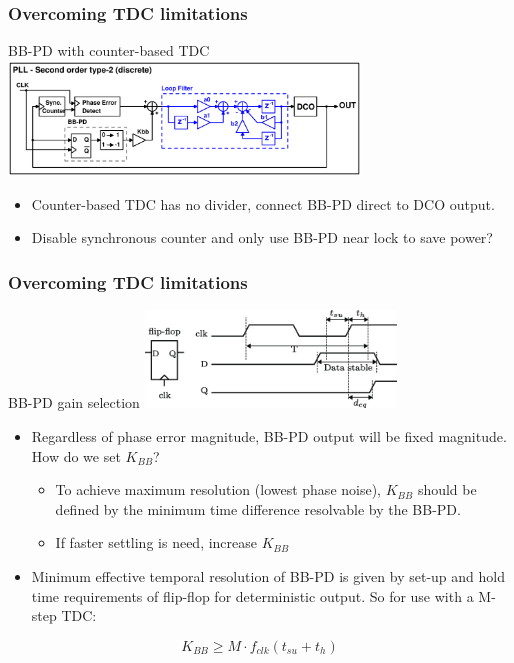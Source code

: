 \documentclass[t, screen, aspectratio=43]{beamer}
\begin{document}
\begin{frame}
	\frametitle{Overcoming TDC limitations}
	\begin{block}{BB-PD with counter-based TDC}
		\center\includegraphics[width=0.7\textwidth, angle=0]{pll_sec_order_bb_counter.pdf}
		\begin{itemize}
			\scriptsize
			\item Counter-based TDC has no divider, connect BB-PD direct to DCO output.
			\item Disable synchronous counter and only use BB-PD near lock to save power?
		\end{itemize}	
	\end{block}
\end{frame}

\begin{frame}
	\frametitle{Overcoming TDC limitations}
	\begin{block}{BB-PD gain selection}
	\vspace{-0.5em}
		\center\includegraphics[width=0.5\textwidth, angle=0]{ff_setup_hold.png}
		\begin{itemize}
			\scriptsize
			\item Regardless of phase error magnitude, BB-PD output will be fixed magnitude. How do we set $K_{BB}$?
		\begin{itemize}
			\scriptsize
			\item To achieve maximum resolution (lowest phase noise), $K_{BB}$ should be defined by the minimum time difference resolvable by the BB-PD.
			\item If faster settling is need, increase $K_{BB}$
		\end{itemize}	
		\item Minimum effective temporal resolution of BB-PD is given by set-up and hold time requirements of flip-flop for deterministic output. So for use with a M-step TDC:
		\end{itemize}	
	\tiny
	\begin{equation}
		K_{BB} \geq M\cdot f_{clk}(t_{su}+t_{h})
	\end{equation}
	\end{block}
\end{frame}
\end{document}
